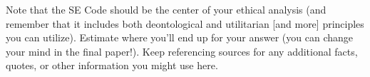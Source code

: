 \documentclass[12pt]{article}
\begin{document}
Note that the SE Code should be the center of your ethical analysis (and remember that it includes both deontological and utilitarian [and more] principles you can utilize). Estimate where you'll end up for your answer (you can change your mind in the final paper!). Keep referencing sources for any additional facts, quotes, or other information you might use here. \cite{handout}

\nocite{*}




\end{document}
